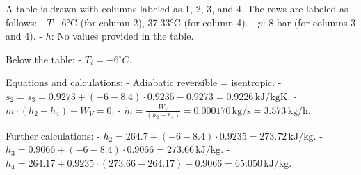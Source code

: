 A table is drawn with columns labeled as 1, 2, 3, and 4. The rows are labeled as follows:  
- \( T \): -6°C (for column 2), 37.33°C (for column 4).  
- \( p \): 8 bar (for columns 3 and 4).  
- \( h \): No values provided in the table.  

Below the table:  
- \( T_i = -6^\circ C \).  

Equations and calculations:  
- Adiabatic reversible = isentropic.  
- \( s_2 = s_3 = 0.9273 + (-6 - 8.4) \cdot 0.9235 - 0.9273 = 0.9226 \, \text{kJ/kgK} \).  
- \( \dot{m} \cdot (h_2 - h_4) - W_V = 0 \).  
- \( \dot{m} = \frac{W_V}{(h_2 - h_4)} = 0.000170 \, \text{kg/s} = 3.573 \, \text{kg/h} \).  

Further calculations:  
- \( h_2 = 264.7 + (-6 - 8.4) \cdot 0.9235 = 273.72 \, \text{kJ/kg} \).  
- \( h_3 = 0.9066 + (-6 - 8.4) \cdot 0.9066 = 273.66 \, \text{kJ/kg} \).  
- \( h_4 = 264.17 + 0.9235 \cdot (273.66 - 264.17) - 0.9066 = 65.050 \, \text{kJ/kg} \).